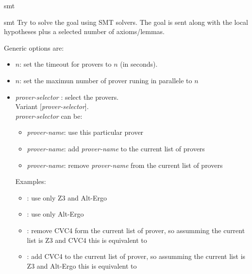 \begin{tactic}{smt}
  \begin{tsyntax}[empty]{smt}
  Try to solve the goal using SMT solvers. The goal is sent along with 
  the local hypotheses plus a selected number of axioms/lemmas.
  \end{tsyntax}
  Generic options are:
  \begin{itemize}
    \item {}$n$: set the timeout for provers to $n$ (in seconds).
    \item {}$n$: set the maximun number of prover runing in 
          parallele to $n$ 
    \item \ec{prover=[}\textit{prover-selector}\ec{]} : select the provers. \\
          Variant [\textit{prover-selector}]. \\
          \textit{prover-selector} can be:
          \begin{itemize}
            \item {}\textit{prover-name}: use this particular prover
            \item {}\textit{prover-name}: add \textit{prover-name} 
                    to the current list of provers
            \item {}\textit{prover-name}: 
                    remove \textit{prover-name} 
                    from the current list of provers 
          \end{itemize}
          Examples:
          \begin{itemize}
          \item {}: use only Z3 and Alt-Ergo 
          \item {}: use only Alt-Ergo 
          \item \ec{[-''CVC4'']}: remove CVC4 form the current list of prover,
                so assumming the current list is Z3 and CVC4 this is equivalent
                to \ec{[``Z3'']}
          \item \ec{[+''CVC4'']}: add CVC4 to the current list of prover,
                so assumming the current list is Z3 and Alt-Ergo this is
                equivalent
                to 
          \end{itemize}          
  \end{itemize}

\end{tactic}

